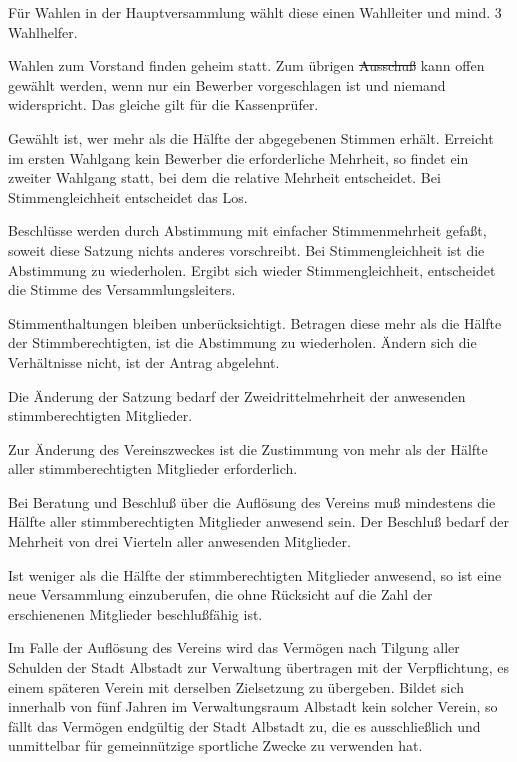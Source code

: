 \documentclass[10pt,a4paper,parskip=half]{scrartcl}
\providecommand{\DIFaddtex}[1]{{\protect\color{blue}\uwave{#1}}} %
\providecommand{\DIFdeltex}[1]{{\protect\color{red}\sout{#1}}}                      %
\providecommand{\DIFaddbegin}{} %
\providecommand{\DIFaddend}{} %
\providecommand{\DIFdelbegin}{} %
\providecommand{\DIFdelend}{} %
\providecommand{\DIFadd}[1]{\texorpdfstring{\DIFaddtex{#1}}{#1}} %
\providecommand{\DIFdel}[1]{\texorpdfstring{\DIFdeltex{#1}}{}} %
\newcommand{\DIFscaledelfig}{0.5}
\newlength{\DIFdelgraphicswidth} %
\newlength{\DIFdelgraphicsheight} %
\newcommand{\DIFaddincludegraphics}[2][]{{\color{blue}\fbox{\DIFOincludegraphics[#1]{#2}}}} %
\newcommand{\DIFdelincludegraphics}[2][]{%
\sbox{\DIFdelgraphicsbox}{\DIFOincludegraphics[#1]{#2}}%
\settoboxwidth{\DIFdelgraphicswidth}{\DIFdelgraphicsbox} %
\settoboxtotalheight{\DIFdelgraphicsheight}{\DIFdelgraphicsbox} %
\scalebox{\DIFscaledelfig}{%
\parbox[b]{\DIFdelgraphicswidth}{\usebox{\DIFdelgraphicsbox}\\[-\baselineskip] \rule{\DIFdelgraphicswidth}{0em}}\llap{\resizebox{\DIFdelgraphicswidth}{\DIFdelgraphicsheight}{%
\setlength{\unitlength}{\DIFdelgraphicswidth}%
\begin{picture}(1,1)%
\thicklines\linethickness{2pt} %
{\color[rgb]{1,0,0}\put(0,0){\framebox(1,1){}}}%
{\color[rgb]{1,0,0}\put(0,0){\line( 1,1){1}}}%
{\color[rgb]{1,0,0}\put(0,1){\line(1,-1){1}}}%
\end{picture}%
}\hspace*{3pt}}} %
} %
\DeclareRobustCommand{\DIFaddbegin}{\DIFOaddbegin \let\includegraphics\DIFaddincludegraphics} %
\DeclareRobustCommand{\DIFaddend}{\DIFOaddend \let\includegraphics\DIFOincludegraphics} %
\DeclareRobustCommand{\DIFdelbegin}{\DIFOdelbegin \let\includegraphics\DIFdelincludegraphics} %
\DeclareRobustCommand{\DIFdelend}{\DIFOaddend \let\includegraphics\DIFOincludegraphics} %
\begin{document}
\begin{contract}
    \label{C:WahlenUndAbstimmungen}
    Für Wahlen in der Hauptversammlung wählt diese einen Wahlleiter und mind. 3 Wahlhelfer.

    Wahlen zum Vorstand finden geheim statt.
    Zum übrigen \DIFdelbegin \DIFdel{Ausschuß }\DIFdelend \DIFaddbegin \DIFadd{Ausschuss }\DIFaddend kann offen gewählt werden,
    wenn nur ein Bewerber vorgeschlagen ist und niemand widerspricht.
    Das gleiche gilt für die Kassenprüfer.

    Gewählt ist,
    wer mehr als die Hälfte der abgegebenen Stimmen erhält.
    Erreicht im ersten Wahlgang kein Bewerber die erforderliche Mehrheit,
    so findet ein zweiter Wahlgang statt,
    bei dem die relative Mehrheit entscheidet.
    Bei Stimmengleichheit entscheidet das Los.

    Beschlüsse werden durch Abstimmung mit einfacher Stimmenmehrheit gefaßt,
    soweit diese Satzung nichts anderes vorschreibt.
    Bei Stimmengleichheit ist die Abstimmung zu wiederholen.
    Ergibt sich wieder Stimmengleichheit,
    entscheidet die Stimme des Versammlungsleiters.

    Stimmenthaltungen bleiben unberücksichtigt.
    Betragen diese mehr als die Hälfte der Stimmberechtigten,
    ist die Abstimmung zu wiederholen.
    Ändern sich die Verhältnisse nicht,
    ist der Antrag abgelehnt.

    Die Änderung der Satzung bedarf der Zweidrittelmehrheit der anwesenden stimmberechtigten Mitglieder.

    Zur Änderung des Vereinszweckes ist die Zustimmung von mehr als der Hälfte aller stimmberechtigten Mitglieder erforderlich.

    Bei Beratung und Beschluß über die Auflösung des Vereins muß mindestens die Hälfte aller stimmberechtigten Mitglieder anwesend sein.
    Der Beschluß bedarf der Mehrheit von drei Vierteln aller anwesenden Mitglieder.

    Ist weniger als die Hälfte der stimmberechtigten Mitglieder anwesend,
    so ist eine neue Versammlung einzuberufen,
    die ohne Rücksicht auf die Zahl der erschienenen Mitglieder beschlußfähig ist.

    Im Falle der Auflösung des Vereins wird das Vermögen nach Tilgung aller Schulden der Stadt Albstadt zur Verwaltung übertragen mit der Verpflichtung,
    es einem späteren Verein mit derselben Zielsetzung zu übergeben.
    Bildet sich innerhalb von fünf Jahren im Verwaltungsraum Albstadt kein solcher Verein,
    so fällt das Vermögen endgültig der Stadt Albstadt zu,
    die es ausschließlich und unmittelbar für gemeinnützige sportliche Zwecke zu verwenden hat.
    \DIFaddbegin 


\end{contract}
\end{document}
